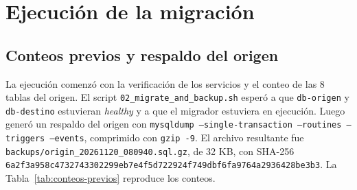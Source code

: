 
\section{Ejecución de la migración}

\subsection{Conteos previos y respaldo del origen}

La ejecución comenzó con la verificación de los servicios y el conteo de las
8 tablas del origen. El script \texttt{02\_migrate\_and\_backup.sh} esperó a
que \texttt{db-origen} y \texttt{db-destino} estuvieran \emph{healthy} y a que
el migrador estuviera en ejecución. Luego generó un respaldo del origen con
\texttt{mysqldump --single-transaction --routines --triggers --events},
comprimido con \texttt{gzip -9}. El archivo resultante fue
\texttt{backups/origin\_20261120\_080940.sql.gz}, de 32 KB, con SHA-256
\texttt{6a2f3a958c4732743302299eb7e4f5d722924f749dbf6fa9764a2936428be3b3}.
La Tabla~\ref{tab:conteos-previos} reproduce los conteos.

\begin{table}[H]
  \centering
  \caption{Conteos del origen antes de la migración}
  \label{tab:conteos-previos}
\end{table}

